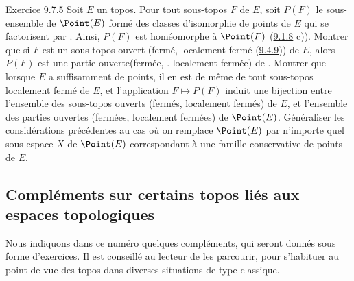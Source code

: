 \begin{enonce*}[remark]{Exercice 9.7.5}
Soit $E$ un topos. Pour tout sous-topos $F$ de $E$, soit $P(F)$ le
sous-ensemble de $\Point(E)$ formé des classes d'isomorphie de
points de $E$ qui se factorisent par . Ainsi, $P(F)$ est
homéomorphe à $\Point(F)$ (\hyperref[IV.exer9.1.8]{9.1.8} c)). Montrer que si
$F$ est un sous-topos ouvert (\resp fermé, \resp localement fermé
(\hyperref[IV.exer9.4.9]{9.4.9})) de $E$, alors $P(F)$ est une partie
ouverte\pageoriginale (\resp fermée, \resp. localement fermée) de
. Montrer que lorsque $E$ a suffisamment de points, il en est de
même de tout sous-topos localement fermé de $E$, et l'application
$F\mapsto P(F)$ induit une bijection entre l'ensemble des sous-topos
ouverts (\resp fermés, \resp localement fermés) de $E$, et
l'ensemble des parties ouvertes (\resp fermées, \resp localement
fermées) de $\Point(E)$. Généraliser les
considérations précédentes
au cas où on remplace $\Point(E)$ par n'importe quel sous-espace $X$
de $\Point(E)$ correspondant à une famille conservative de points de
$E$.
\end{enonce*}

\subsection{Compléments sur certains topos liés aux espaces topologiques}

Nous indiquons dans ce numéro quelques compléments, qui seront
donnés sous forme d'exercices. Il est conseillé au lecteur de les
parcourir, pour s'habituer au point de vue des topos dans diverses
situations de type classique.

